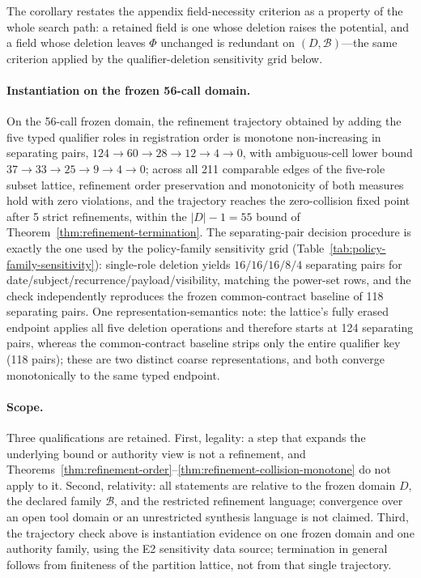 The corollary restates the appendix field-necessity criterion as a property of
the whole search path: a retained field is one whose deletion raises the
potential, and a field whose deletion leaves $\Phi$ unchanged is redundant on
$(D,\mathcal{B})$---the same criterion applied by the qualifier-deletion
sensitivity grid below.

\paragraph{Instantiation on the frozen 56-call domain.}
On the 56-call frozen domain, the refinement trajectory obtained by adding the
five typed qualifier roles in registration order is monotone non-increasing in
separating pairs, $124\to60\to28\to12\to4\to0$, with ambiguous-cell lower
bound $37\to33\to25\to9\to4\to0$; across all 211 comparable edges of the
five-role subset lattice, refinement order preservation and monotonicity of
both measures hold with zero violations, and the trajectory reaches the
zero-collision fixed point after 5 strict refinements, within the
$|D|-1=55$ bound of Theorem~\ref{thm:refinement-termination}. The
separating-pair decision procedure is exactly the one used by the
policy-family sensitivity grid (Table~\ref{tab:policy-family-sensitivity}):
single-role deletion yields $16/16/16/8/4$ separating pairs for
date/subject/recurrence/payload/visibility, matching the power-set rows, and
the check independently reproduces the frozen common-contract baseline of 118
separating pairs. One representation-semantics note: the lattice's fully
erased endpoint applies all five deletion operations and therefore starts at
124 separating pairs, whereas the common-contract baseline strips only the
entire qualifier key (118 pairs); these are two distinct coarse
representations, and both converge monotonically to the same typed endpoint.

\paragraph{Scope.}
Three qualifications are retained. First, legality: a step that expands the
underlying bound or authority view is not a refinement, and
Theorems~\ref{thm:refinement-order}--\ref{thm:refinement-collision-monotone}
do not apply to it. Second, relativity: all statements are relative to the
frozen domain $D$, the declared family $\mathcal{B}$, and the restricted
refinement language; convergence over an open tool domain or an unrestricted
synthesis language is not claimed. Third, the trajectory check above is
instantiation evidence on one frozen domain and one authority family, using
the E2 sensitivity data source; termination in general follows from finiteness
of the partition lattice, not from that single trajectory.


